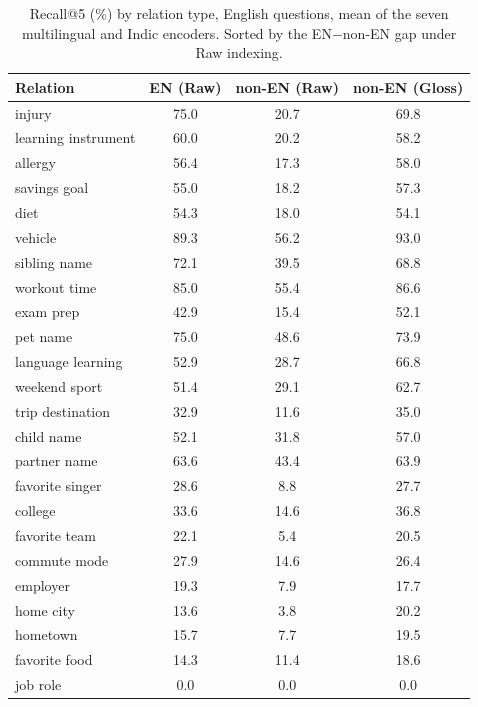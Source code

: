 \begin{table}[h]
\centering
\small
\caption{Recall@5 (\%) by relation type, English questions, mean of the seven multilingual and Indic encoders. Sorted by the EN$-$non-EN gap under Raw indexing.}
\label{tab:relation}
\begin{tabular}{@{}l ccc@{}}
\toprule
Relation & EN (Raw) & non-EN (Raw) & non-EN (Gloss) \\
\midrule
injury & 75.0 & 20.7 & 69.8 \\
learning instrument & 60.0 & 20.2 & 58.2 \\
allergy & 56.4 & 17.3 & 58.0 \\
savings goal & 55.0 & 18.2 & 57.3 \\
diet & 54.3 & 18.0 & 54.1 \\
vehicle & 89.3 & 56.2 & 93.0 \\
sibling name & 72.1 & 39.5 & 68.8 \\
workout time & 85.0 & 55.4 & 86.6 \\
exam prep & 42.9 & 15.4 & 52.1 \\
pet name & 75.0 & 48.6 & 73.9 \\
language learning & 52.9 & 28.7 & 66.8 \\
weekend sport & 51.4 & 29.1 & 62.7 \\
trip destination & 32.9 & 11.6 & 35.0 \\
child name & 52.1 & 31.8 & 57.0 \\
partner name & 63.6 & 43.4 & 63.9 \\
favorite singer & 28.6 & 8.8 & 27.7 \\
college & 33.6 & 14.6 & 36.8 \\
favorite team & 22.1 & 5.4 & 20.5 \\
commute mode & 27.9 & 14.6 & 26.4 \\
employer & 19.3 & 7.9 & 17.7 \\
home city & 13.6 & 3.8 & 20.2 \\
hometown & 15.7 & 7.7 & 19.5 \\
favorite food & 14.3 & 11.4 & 18.6 \\
job role & 0.0 & 0.0 & 0.0 \\
\bottomrule
\end{tabular}
\end{table}
